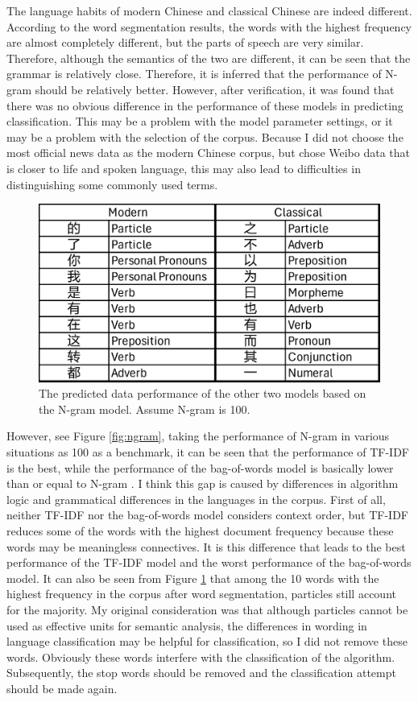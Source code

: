 \documentclass[11pt]{article}
\begin{document}
The language habits of modern Chinese and classical Chinese are indeed different. According to the word segmentation results, the words with the highest frequency are almost completely different, but the parts of speech are very similar. Therefore, although the semantics of the two are different, it can be seen that the grammar is relatively close. Therefore, it is inferred that the performance of N-gram should be relatively better. However, after verification, it was found that there was no obvious difference in the performance of these models in predicting classification. This may be a problem with the model parameter settings, or it may be a problem with the selection of the corpus. Because I did not choose the most official news data as the modern Chinese corpus, but chose Weibo data that is closer to life and spoken language, this may also lead to difficulties in distinguishing some commonly used terms.

\begin{figure}[t]
  \includegraphics[width=\columnwidth]{figures/4.pdf}
  \caption{The predicted data performance of the other two models based on the N-gram model. Assume N-gram is 100.}
  \label{fig:language}
\end{figure}

However, see Figure \ref{fig:ngram}, taking the performance of N-gram in various situations as 100 as a benchmark, it can be seen that the performance of TF-IDF is the best, while the performance of the bag-of-words model is basically lower than or equal to N-gram . I think this gap is caused by differences in algorithm logic and grammatical differences in the languages in the corpus. First of all, neither TF-IDF nor the bag-of-words model considers context order, but TF-IDF reduces some of the words with the highest document frequency because these words may be meaningless connectives. It is this difference that leads to the best performance of the TF-IDF model and the worst performance of the bag-of-words model. It can also be seen from Figure \ref{fig:language} that among the 10 words with the highest frequency in the corpus after word segmentation, particles still account for the majority. My original consideration was that although particles cannot be used as effective units for semantic analysis, the differences in wording in language classification may be helpful for classification, so I did not remove these words. Obviously these words interfere with the classification of the algorithm. Subsequently, the stop words should be removed and the classification attempt should be made again.
\end{document}
